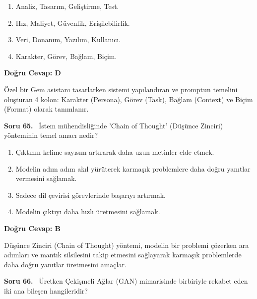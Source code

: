 \documentclass[11pt,a4paper,openany]{book}
\begin{document}
\begin{enumerate}[label=\Alph*), leftmargin=25pt, topsep=4pt, itemsep=2pt]
        \item Analiz, Tasarım, Geliştirme, Test.
        \item Hız, Maliyet, Güvenlik, Erişilebilirlik.
        \item Veri, Donanım, Yazılım, Kullanıcı.
        \item Karakter, Görev, Bağlam, Biçim.
\end{enumerate}

\vspace{4pt}
\begin{tcolorbox}[title=Cevap ve Açıklama, colback=gray!3!white, colframe=primarycolor!90!black, arc=2mm, fonttitle=\bfseries\sffamily, top=6pt, bottom=6pt]
    \textbf{Doğru Cevap: D}

    \vspace{2pt}
    Özel bir Gem asistanı tasarlarken sistemi yapılandıran ve promptun temelini oluşturan 4 kolon: Karakter (Persona), Görev (Task), Bağlam (Context) ve Biçim (Format) olarak tanımlanır.
\end{tcolorbox}
\vspace{10pt}
\needspace{5cm}
\vspace{8pt}
\noindent\textbf{\large\sffamily Soru 65.} \ İstem mühendisliğinde 'Chain of Thought' (Düşünce Zinciri) yönteminin temel amacı nedir?

\begin{enumerate}[label=\Alph*), leftmargin=25pt, topsep=4pt, itemsep=2pt]
        \item Çıktının kelime sayısını artırarak daha uzun metinler elde etmek.
        \item Modelin adım adım akıl yürüterek karmaşık problemlere daha doğru yanıtlar vermesini sağlamak.
        \item Sadece dil çevirisi görevlerinde başarıyı artırmak.
        \item Modelin çıktıyı daha hızlı üretmesini sağlamak.
\end{enumerate}

\vspace{4pt}
\begin{tcolorbox}[title=Cevap ve Açıklama, colback=gray!3!white, colframe=primarycolor!90!black, arc=2mm, fonttitle=\bfseries\sffamily, top=6pt, bottom=6pt]
    \textbf{Doğru Cevap: B}

    \vspace{2pt}
    Düşünce Zinciri (Chain of Thought) yöntemi, modelin bir problemi çözerken ara adımları ve mantık silsilesini takip etmesini sağlayarak karmaşık problemlerde daha doğru yanıtlar üretmesini amaçlar.
\end{tcolorbox}
\vspace{10pt}
\needspace{5cm}
\vspace{8pt}
\noindent\textbf{\large\sffamily Soru 66.} \ Üretken Çekişmeli Ağlar (GAN) mimarisinde birbiriyle rekabet eden iki ana bileşen hangileridir?
\end{document}
